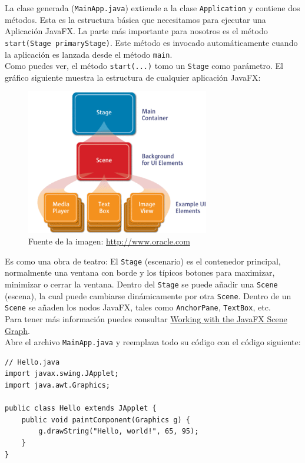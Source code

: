 La clase generada (\textcolor{codigo}{\texttt{MainApp.java}}) extiende a la clase \textcolor{codigo}{\texttt{Application}} y contiene dos métodos. Esta es la estructura básica que necesitamos para ejecutar una Aplicación JavaFX. La parte más importante para nosotros es el método \textcolor{codigo}{\texttt{start(Stage primaryStage)}}. Este método es invocado automáticamente cuando la aplicación es lanzada desde el método \textcolor{codigo}{\texttt{main}}.\\
Como puedes ver, el método \textcolor{codigo}{\texttt{start(...)}} tomo un \textcolor{codigo}{\texttt{Stage}} como parámetro. El gráfico siguiente muestra la estructura de cualquier aplicación JavaFX:
\begin{figure}[H]
	\includegraphics[width=8cm]{img/javafx-hierarchy}
	\caption*{Fuente de la imagen: \textcolor{azul}{\href{http://www.oracle.com}{http://www.oracle.com}}}
\end{figure}

Es como una obra de teatro: El \textcolor{codigo}{\texttt{Stage}} (escenario) es el contenedor principal, normalmente una ventana con borde y los típicos botones para maximizar, minimizar o cerrar la ventana. Dentro del \textcolor{codigo}{\texttt{Stage}} se puede añadir una \textcolor{codigo}{\texttt{Scene}} (escena), la cual puede cambiarse dinámicamente por otra \textcolor{codigo}{\texttt{Scene}}. Dentro de un \textcolor{codigo}{\texttt{Scene}} se añaden los nodos JavaFX, tales como \textcolor{codigo}{\texttt{AnchorPane}}, \textcolor{codigo}{\texttt{TextBox}}, etc.\\
Para tener más información puedes consultar \textcolor{azul}{\href{https://docs.oracle.com/javase/8/javafx/scene-graph-tutorial/scenegraph.htm}{Working with the JavaFX Scene Graph}}.\\
Abre el archivo \textcolor{codigo}{\texttt{MainApp.java}} y reemplaza todo su código con el código siguiente:


\begin{lstlisting}
// Hello.java
import javax.swing.JApplet;
import java.awt.Graphics;

public class Hello extends JApplet {
	public void paintComponent(Graphics g) {
		g.drawString("Hello, world!", 65, 95);
	}    
}
\end{lstlisting}
